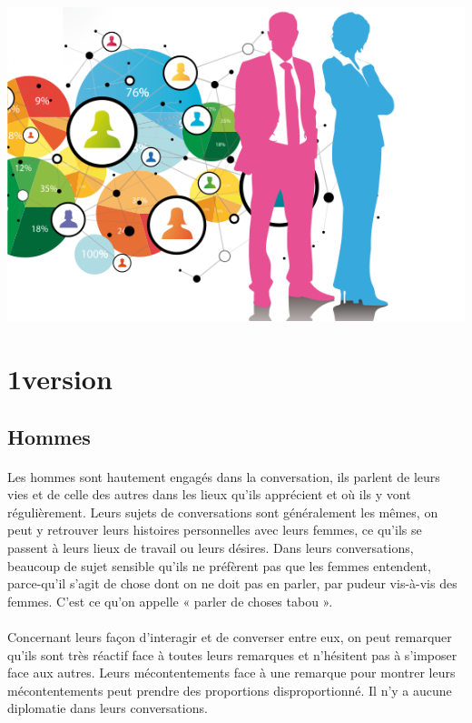 \begin{center}
	\includegraphics[scale=0.7]{h-f.png}
\end{center}

\section{1\iere version}

\subsection{Hommes}

\paragraph{} Les hommes sont hautement engagés dans la conversation, ils
parlent de leurs vies et de celle des autres dans les lieux qu'ils apprécient
et où ils y vont régulièrement. Leurs sujets de conversations sont généralement
les mêmes, on peut y retrouver leurs histoires personnelles avec leurs femmes,
ce qu'ils se passent à leurs lieux de travail ou leurs désires. Dans leurs
conversations, beaucoup de sujet sensible qu'ils ne préfèrent pas que les
femmes entendent, parce-qu'il s'agit de chose dont on ne doit pas en parler,
par pudeur vis-à-vis des femmes. C'est ce qu'on appelle « parler de choses
tabou ».

\paragraph{} Concernant leurs façon d'interagir et de converser entre eux, on
peut remarquer qu'ils sont très réactif face à toutes leurs remarques et
n'hésitent pas à s'imposer face aux autres. Leurs mécontentements face à une
remarque pour montrer leurs mécontentements peut prendre des proportions
disproportionné. Il n'y a aucune diplomatie dans leurs conversations.

